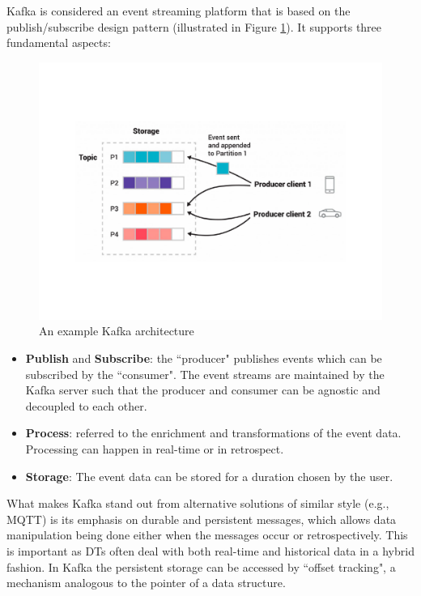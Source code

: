 Kafka is considered an event streaming platform \cite{Kafka} that is based on the publish/subscribe design pattern (illustrated in Figure \ref{fig:kafka_example}). It supports three fundamental aspects:

\begin{figure}[hbt!]
  \centering
  \includegraphics[scale=0.4]{figures/kafka_example.pdf}
  \caption [An example Kafka architecture] {An example Kafka architecture \cite{Kafka}}
  \label{fig:kafka_example}
\end{figure}

\begin{itemize}
\item \textbf{Publish} and \textbf{Subscribe}: the ``producer" publishes events which can be subscribed by the ``consumer". The event streams are maintained by the Kafka server such that the producer and consumer can be agnostic and decoupled to each other.
\item \textbf{Process}: referred to the enrichment and transformations of the event data. Processing can happen in real-time or in retrospect.
\item \textbf{Storage}: The event data can be stored for a duration chosen by the user.
\end{itemize} 

What makes Kafka stand out from alternative solutions of similar style (e.g., MQTT) is its emphasis on durable and persistent messages, which allows data manipulation being done either when the messages occur or retrospectively. This is important as DTs often deal with both real-time and historical data in a hybrid fashion. In Kafka the persistent storage can be accessed by ``offset tracking", a mechanism analogous to the pointer of a data structure. 

